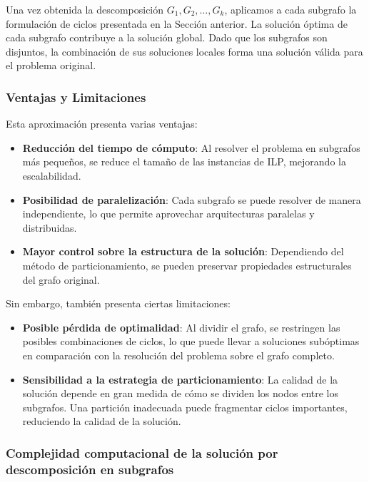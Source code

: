 \documentclass[twocolumn, fontsize=10pt]{article}
\begin{document}
Una vez obtenida la descomposición \( G_1, G_2, \dots, G_k \), aplicamos a cada subgrafo la formulación de ciclos presentada en la Sección anterior. La solución óptima de cada subgrafo contribuye a la solución global. Dado que los subgrafos son disjuntos, la combinación de sus soluciones locales forma una solución válida para el problema original.

\subsubsection{Ventajas y Limitaciones}

Esta aproximación presenta varias ventajas:

\begin{itemize}
    \item \textbf{Reducción del tiempo de cómputo}: Al resolver el problema en subgrafos más pequeños, se reduce el tamaño de las instancias de ILP, mejorando la escalabilidad.
    \item \textbf{Posibilidad de paralelización}: Cada subgrafo se puede resolver de manera independiente, lo que permite aprovechar arquitecturas paralelas y distribuidas.
    \item \textbf{Mayor control sobre la estructura de la solución}: Dependiendo del método de particionamiento, se pueden preservar propiedades estructurales del grafo original.
\end{itemize}

Sin embargo, también presenta ciertas limitaciones:

\begin{itemize}
    \item \textbf{Posible pérdida de optimalidad}: Al dividir el grafo, se restringen las posibles combinaciones de ciclos, lo que puede llevar a soluciones subóptimas en comparación con la resolución del problema sobre el grafo completo.
    \item \textbf{Sensibilidad a la estrategia de particionamiento}: La calidad de la solución depende en gran medida de cómo se dividen los nodos entre los subgrafos. Una partición inadecuada puede fragmentar ciclos importantes, reduciendo la calidad de la solución.
\end{itemize}

\subsubsection{Complejidad computacional de la solución por descomposición en subgrafos}
\end{document}
